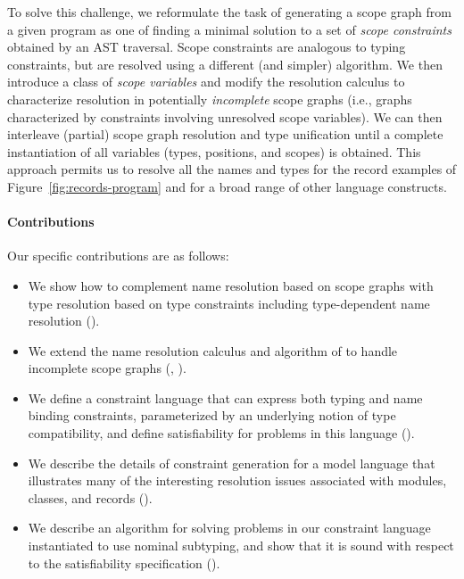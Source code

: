 To solve this challenge, we reformulate the task of generating a scope graph
from a given program as one of finding a minimal solution to a set of {\it scope
constraints} obtained by an AST traversal.
Scope constraints are analogous to typing constraints, but are resolved using a
different (and simpler) algorithm.
We then introduce a class of {\it scope variables} and modify the resolution
calculus to characterize resolution in potentially {\it incomplete} scope graphs
(i.e., graphs characterized by constraints involving unresolved scope
variables).
We can then interleave (partial) scope graph resolution and type unification
until a complete instantiation of all variables (types, positions, and scopes)
is obtained.  This approach permits us to resolve all the names and types for
the record examples of Figure~\ref{fig:records-program} and for a broad range of
other language constructs.

\paragraph{Contributions}

Our specific contributions are as follows:

\begin{itemize}
\item We show how to complement name resolution based on scope graphs with
  type resolution based on type constraints including
  type-dependent name resolution ().
\item We extend the name resolution calculus and algorithm of 
\cite{NeronTVW-ESOP-2015} to handle incomplete scope graphs 
(, ).
\item We define a constraint language that can express both typing and name
binding constraints, parameterized by an underlying notion of type
compatibility, and define satisfiability for problems in this language
().
\item We describe the details of constraint generation for a model
language that illustrates many of the interesting resolution issues
associated with modules, classes, and records (). 
\item We describe an algorithm for solving problems in our constraint
language instantiated to use nominal subtyping, and show that it is 
sound with respect to the satisfiability
specification ().
\end{itemize}

